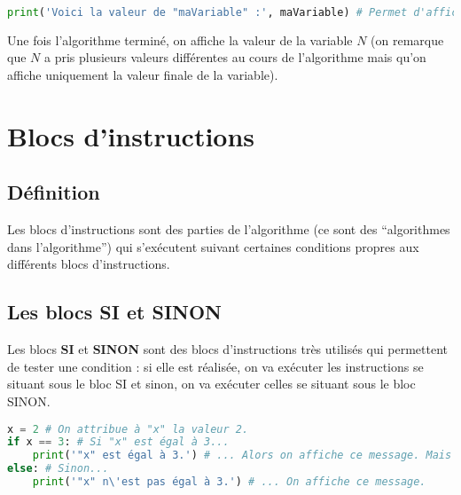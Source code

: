 	\begin{formula}[En python]
		\entretitreetliste
\begin{lstlisting}[language=python]
print('Voici la valeur de "maVariable" :', maVariable) # Permet d'afficher la valeur de "maVariable".
\end{lstlisting}
	\end{formula}

	\begin{tip}
		Une fois l'algorithme terminé, on affiche la valeur de la variable $N$ (on remarque que $N$ a pris plusieurs valeurs différentes au cours de l'algorithme mais qu'on affiche uniquement la valeur finale de la variable).
	\end{tip}

	\section{Blocs d'instructions}

	\subsection{Définition}

	Les blocs d'instructions sont des parties de l'algorithme (ce sont des ``algorithmes dans l'algorithme'') qui s'exécutent suivant certaines conditions propres aux différents blocs d'instructions.

	\subsection{Les blocs SI et SINON}

	Les blocs \textbf{SI} et \textbf{SINON} sont des blocs d'instructions très utilisés qui permettent de tester une condition : si elle est réalisée, on va exécuter les instructions se situant sous le bloc SI et sinon, on va exécuter celles se situant sous le bloc SINON.

	\begin{formula}[En python]
		\entretitreetliste
\begin{lstlisting}[language=python]
x = 2 # On attribue à "x" la valeur 2.
if x == 3: # Si "x" est égal à 3...
	print('"x" est égal à 3.') # ... Alors on affiche ce message. Mais ici, "x" vaut 2 donc ce message ne sera jamais affiché.
else: # Sinon...
	print('"x" n\'est pas égal à 3.') # ... On affiche ce message.
\end{lstlisting}
	\end{formula}

